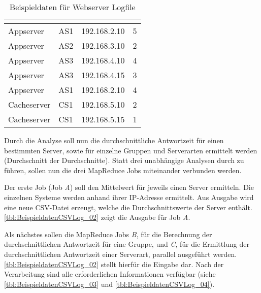 \begin{table}[h]
	\centering
	\begin{tabular}{| l | l | l | r |}
		\hline
		\rowcolor[HTML]{3531FF} 
		\multicolumn{1}{l|}{\cellcolor[HTML]{4F88BB}{\color[HTML]{FFFFFF} {\bf Serverart}}} & \multicolumn{1}{l|}{\cellcolor[HTML]{4F88BB}{\color[HTML]{FFFFFF} {\bf Gruppe}}} & \multicolumn{1}{l|}{\cellcolor[HTML]{4F88BB}{\color[HTML]{FFFFFF} {\bf IP-Adresse}}} & \multicolumn{1}{l|}{\cellcolor[HTML]{4F88BB}{\color[HTML]{FFFFFF} {\bf Antwortzeit (in Sekunden)}}} \\ \hline
		Appserver & AS1 & 192.168.2.10 & 5 \\ \hline
		Appserver & AS2 & 192.168.3.10 & 2 \\ \hline
		Appserver & AS3 & 192.168.4.10 & 4 \\ \hline
		Appserver & AS3 & 192.168.4.15 & 3 \\ \hline
		Appserver & AS1 & 192.168.2.10 & 4 \\ \hline
		Cacheserver & CS1 & 192.168.5.10 & 2 \\ \hline
		Cacheserver & CS1 & 192.168.5.15 & 1 \\ \hline
	\end{tabular}
	\caption{Beispieldaten für Webserver Logfile}
	\label{tbl:BeispieldatenCSVLog}
\end{table}

Durch die Analyse soll nun die durchschnittliche Antwortzeit für einen bestimmten Server, sowie für einzelne Gruppen und Serverarten ermittelt werden (Durchschnitt der Durchschnitte). Statt drei unabhängige Analysen durch zu führen, sollen nun die drei MapReduce Jobs miteinander verbunden werden.

Der erste Job (Job \textit{A}) soll den Mittelwert für jeweils einen Server ermitteln. Die einzelnen Systeme werden anhand ihrer IP-Adresse ermittelt. Aus Ausgabe wird eine neue CSV-Datei erzeugt, welche die Durchschnittswerte der Server enthält. \autoref{tbl:BeispieldatenCSVLog_02} zeigt die Ausgabe für Job \textit{A}.

Als nächstes sollen die MapReduce Jobs \textit{B}, für die Berechnung der durchschnittlichen Antwortzeit für eine Gruppe, und \textit{C}, für die Ermittlung der durchschnittlichen Antwortzeit einer Serverart, parallel ausgeführt werden. \autoref{tbl:BeispieldatenCSVLog_02} stellt hierfür die Eingabe dar. Nach der Verarbeitung sind alle erforderlichen Informationen verfügbar (siehe \autoref{tbl:BeispieldatenCSVLog_03} und \autoref{tbl:BeispieldatenCSVLog_04}).

